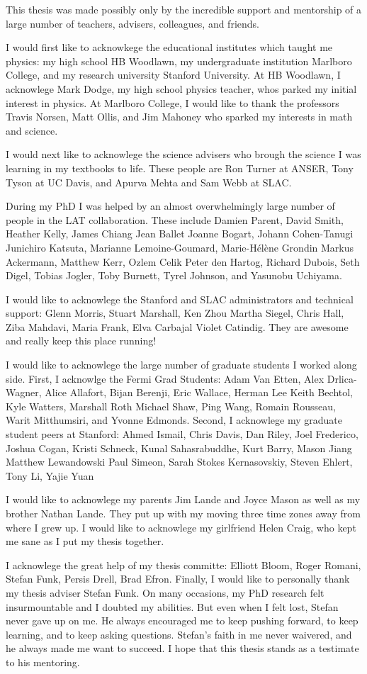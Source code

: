 
This thesis was made possibly only by the incredible support and
mentorship of a large number of teachers, advisers, colleagues, and
friends.

I would first like to acknowkege the educational institutes which taught
me physics: my high school HB Woodlawn, my undergraduate institution
Marlboro College, and my research university Stanford University.  At HB
Woodlawn, I acknowlege Mark Dodge, my high school physics teacher, whos
parked my initial interest in physics. At Marlboro College, I would like
to thank the professors Travis Norsen, Matt Ollis, and Jim Mahoney who
sparked my interests in math and science.

I would next like to acknowlege the science advisers who brough the
science I was learning in my textbooks to life.  These people are Ron
Turner at ANSER, Tony Tyson at UC Davis, and Apurva Mehta and Sam Webb
at SLAC.

During my PhD I was helped by an almost overwhelmingly large number
of people in the \gls{LAT} collaboration.  These include Damien Parent,
David Smith, Heather Kelly, James Chiang Jean Ballet Joanne Bogart, Johann
Cohen-Tanugi Junichiro Katsuta, Marianne Lemoine-Goumard, Marie-H\'el\`ene
Grondin Markus Ackermann, Matthew Kerr, Ozlem Celik Peter den Hartog,
Richard Dubois, Seth Digel, Tobias Jogler, Toby Burnett, Tyrel Johnson,
and Yasunobu Uchiyama.

I would like to acknowlege the Stanford and SLAC administrators and
technical support: Glenn Morris, Stuart Marshall, Ken Zhou Martha Siegel,
Chris Hall, Ziba Mahdavi, Maria Frank, Elva Carbajal Violet Catindig.
They are awesome and really keep this place running!

I would like to acknowlege the large number of graduate students I
worked along side.  First, I acknowlge the Fermi Grad Students: Adam Van
Etten, Alex Drlica-Wagner, Alice Allafort, Bijan Berenji, Eric Wallace,
Herman Lee Keith Bechtol, Kyle Watters, Marshall Roth Michael Shaw, Ping
Wang, Romain Rousseau, Warit Mitthumsiri, and Yvonne Edmonds.  Second,
I acknowlege my graduate student peers at Stanford: Ahmed Ismail, Chris
Davis, Dan Riley, Joel Frederico, Joshua Cogan, Kristi Schneck, Kunal
Sahasrabuddhe, Kurt Barry, Mason Jiang Matthew Lewandowski Paul Simeon,
Sarah Stokes Kernasovskiy, Steven Ehlert, Tony Li, Yajie Yuan

I would like to acknowlege my parents Jim Lande and Joyce Mason as well
as my brother Nathan Lande. They put up with my moving three time zones
away from where I grew up. I would like to acknowlege my girlfriend
Helen Craig, who kept me sane as I put my thesis together.

I acknowlege the great help of my thesis committe: Elliott Bloom, Roger
Romani, Stefan Funk, Persis Drell, Brad Efron. Finally, I would like to
personally thank my thesis adviser Stefan Funk.  On many occasions, my
PhD research felt insurmountable and I doubted my abilities.  But even
when I felt lost, Stefan never gave up on me. He always encouraged me to
keep pushing forward, to keep learning, and to keep asking questions.
Stefan's faith in me never waivered, and he always made me want to
succeed. I hope that this thesis stands as a testimate to his mentoring.
